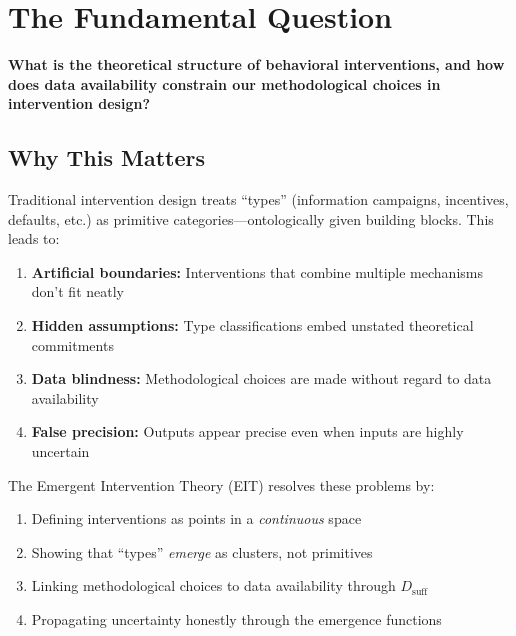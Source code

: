 \section{The Fundamental Question}
\label{sec:ie-fundamental}

\begin{tcolorbox}[colback=red!5!white, colframe=red!75!black,
    title=\textbf{Central Question}]
\textbf{What is the theoretical structure of behavioral interventions, and how does data availability constrain our methodological choices in intervention design?}
\end{tcolorbox}

\subsection{Why This Matters}

Traditional intervention design treats ``types'' (information campaigns, incentives, defaults, etc.) as primitive categories---ontologically given building blocks. This leads to:

\begin{enumerate}
\item \textbf{Artificial boundaries:} Interventions that combine multiple mechanisms don't fit neatly
\item \textbf{Hidden assumptions:} Type classifications embed unstated theoretical commitments
\item \textbf{Data blindness:} Methodological choices are made without regard to data availability
\item \textbf{False precision:} Outputs appear precise even when inputs are highly uncertain
\end{enumerate}

The Emergent Intervention Theory (EIT) resolves these problems by:
\begin{enumerate}
\item Defining interventions as points in a \textit{continuous} space
\item Showing that ``types'' \textit{emerge} as clusters, not primitives
\item Linking methodological choices to data availability through $D_{\text{suff}}$
\item Propagating uncertainty honestly through the emergence functions
\end{enumerate}


